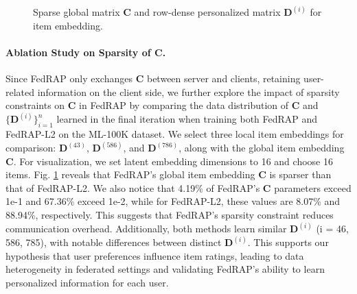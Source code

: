 \documentclass{article} %
\begin{document}
\begin{figure}[!htbp]
    \centering
    \vspace{-0.5em}
     \\
    \caption{Sparse global matrix $\mathbf{C}$ and row-dense personalized matrix $\mathbf{D}^{(i)}$ for item embedding.}
    \label{fig:ablation_distribution}
\end{figure}

\paragraph{Ablation Study on Sparsity of $\mathbf{C}$.}
Since FedRAP only exchanges $\mathbf{C}$ between server and clients, retaining user-related information on the client side, we further explore the impact of sparsity constraints on $\mathbf{C}$ in FedRAP by comparing the data distribution of $\mathbf{C}$ and $\{\mathbf{D}^{(i)}\}^n_{i=1}$ learned in the final iteration when training both FedRAP and FedRAP-L2 on the ML-100K dataset. 
We select three local item embeddings for comparison: $\mathbf{D}^{(43)}$, $\mathbf{D}^{(586)}$, and $\mathbf{D}^{(786)}$, along with the global item embedding $\mathbf{C}$. For visualization, we set latent embedding dimensions to 16 and choose 16 items.
Fig. \ref{fig:ablation_distribution} reveals that FedRAP's global item embedding $\mathbf{C}$ is sparser than that of FedRAP-L2. We also notice that 4.19\% of FedRAP's $\mathbf{C}$ parameters exceed 1e-1 and 67.36\% exceed 1e-2, while for FedRAP-L2, these values are 8.07\% and 88.94\%, respectively. This suggests that FedRAP's sparsity constraint reduces communication overhead. Additionally, both methods learn similar $\mathbf{D}^{(i)}$ (i = 46, 586, 785), with notable differences between distinct $\mathbf{D}^{(i)}$. This supports our hypothesis that user preferences influence item ratings, leading to data heterogeneity in federated settings and validating FedRAP's ability to learn personalized information for each user.
\end{document}
